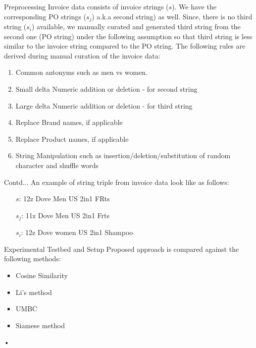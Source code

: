 \documentclass[blue]{beamer}
\begin{document}
\begin{frame}{Preprocessing}
Invoice data  consists of invoice strings ($s$). We have the corresponding PO strings ($s_j$) a.k.a second string) as well. Since, there is no third string ($s_i$) available, we manually curated and generated third string  from the second one (PO string) under the following assumption so that third string is less similar to the invoice string compared to the PO string. The following rules are derived during manual curation of the invoice data:
\begin{enumerate}
    \item Common antonyms such as men vs women.
    \item Small delta Numeric addition or deletion - for second string
    \item Large delta Numeric addition or deletion - for third string
    \item Replace Brand names, if applicable
    \item Replace Product names, if applicable
    \item String Manipulation such as insertion/deletion/substitution of random character and shuffle words
\end{enumerate}

\end{frame}

\begin{frame}{Contd...}
 An example of string triple from invoice data look like as follows:
\begin{itemize}
    \item [$s$:]12z Dove Men US 2in1 FRts
   \item [$s_j$:] 11z Dove Men US 2in1 Frts 
 \item [$s_i$:] 12z Dove women US 2in1 Shampoo
\end{itemize}
\end{frame}

\begin{frame}{Experimental Testbed and Setup}
Proposed approach is compared against the following methods:
\begin{itemize}
\item Cosine Similarity
\item Li's method \cite{li2006sentence}
\item  UMBC \cite{han2013umbc_ebiquity}
\item  Siamese method \cite{neculoiu2016learning}

\end{itemize}•


\end{frame}
\end{document}

